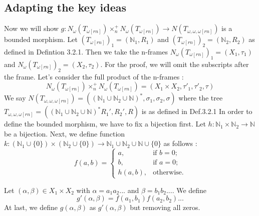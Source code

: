 \documentclass[12pt, a4paper]{scrartcl}
\begin{document}
\subsection{Adapting the key ideas}

    Now we will show $g : N_\omega(T_{\omega[rn]}) \times^+_n N_\omega(T_{\omega[rn]}) \rightarrow N(T_{\omega,\omega,\omega[rn]})$ is a bounded morphism. \newline 
    Let $(T_{\omega[rn]})_1 = (\mathbb{N}_{1}, R_1)$ and $(T_{\omega[rn]})_2 = (\mathbb{N}_{2}, R_2)$ as defined in Defintion 3.2.1.
    Then we take the n-frames $N_\omega(T_{\omega[rn]})_1 = (X_1, \tau_1)$ and $N_\omega(T_{\omega[rn]})_2 = (X_2, \tau_2)$. For the proof, we will omit the subscripts after the frame. \newline \newline
    Let's consider the full product of the n-frames :
    $$N_\omega(T_{\omega[rn]}) \times^+_n N_\omega(T_{\omega[rn]}) = (X_1 \times X_2, \tau'_1, \tau'_2, \tau)$$
    \newline We say $N(T_{\omega,\omega,\omega[rn]}) = ((\mathbb{N}_1 \cup \mathbb{N}_2\cup \mathbb{N})^*, \sigma_1, \sigma_2, \sigma)$ where the tree $T_{\omega,\omega,\omega[rn]} = ((\mathbb{N}_1 \cup \mathbb{N}_2 \cup \mathbb{N})^*R_1',R_2',R)$ is as defined in Def.3.2.1\newline \newline
    In order to define the bounded morphism, we have to fix a bijection first. Let $h : \mathbb{N}_1 \times \mathbb{N}_2 \rightarrow \mathbb{N}$ be a bijection. \newline
    Next, we define function $k :(\mathbb{N}_1 \cup \{0\}) \times (\mathbb{N}_2 \cup \{0\}) \rightarrow \mathbb{N}_1 \cup \mathbb{N}_2 \cup \mathbb{N} \cup \{0\}$ as follows :
    \[
        f(a, b) =
        \begin{cases}
        a, & \text{if } b = 0; \\
        b, & \text{if } a = 0; \\
        h(a, b), & \text{otherwise}.
        \end{cases}
    \]

    Let $(\alpha,\beta) \in X_1 \times X_2$ with $\alpha = a_1a_2...$ and $\beta = b_1b_2...$. We define 
    $$g'(\alpha,\beta) = f(a_1,b_1)f(a_2,b_2)...$$
    At last, we define $g(\alpha,\beta)$ as $g'(\alpha,\beta)$ but removing all zeros.
\end{document}
